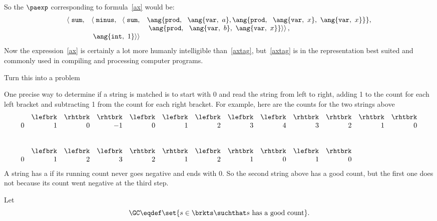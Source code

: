 \begin{editingnotes}
So the $\paexp$ corresponding to formula~\ref{ax} would be:
\begin{equation}\label{axtag}
\begin{array}{rll}
\left< \right. \texttt{sum}, 
         & \left< \right. \texttt{minus},\ \ \left< \right. \texttt{sum},
               & \ang{\texttt{prod},\ \ \ang{\texttt{var},\ a},
                                     \ang{\texttt{prod},\ \
                                            \ang{\texttt{var},\ x},\
                                            \ang{\texttt{var},\ x}}},\\
                               && \left. \left. \ang{\texttt{prod},\ \
                                       \ang{\texttt{var},\ b},\
                                       \ang{\texttt{var},\ x}}
                                   \right> \right>,\\
         & \left. \left. \ang{\texttt{int},\ 1} \right> \right>
\end{array}
\end{equation}
Now the expression~\ref{ax} is certainly a lot more humanly
intelligible than~\ref{axtag}, but~\ref{axtag} is in the
representation best suited and commonly used in compiling and
processing computer programs.

\end{editingnotes}


\begin{editingnotes}

Turn this into a problem

One precise way to determine if a string is matched is to start with 0 and
read the string from left to right, adding 1 to the count for each left
bracket and subtracting 1 from the count for each right bracket.
For example, here are the counts for the two strings above
\[\begin{array}{rrrrrrrrrrrrr}
& \lefbrk & \rhtbrk & \rhtbrk & \lefbrk & \lefbrk & \lefbrk & \lefbrk &
\lefbrk & \rhtbrk & \rhtbrk & \rhtbrk & \rhtbrk\\
0 & 1 & 0 & -1 & 0 & 1 & 2 & 3 & 4 & 3 & 2 & 1 & 0\\
\\
\\
& \lefbrk & \lefbrk & \lefbrk & \rhtbrk & \rhtbrk & \lefbrk & \rhtbrk &
\rhtbrk & \lefbrk & \rhtbrk\\
0 & 1 & 2 & 3 & 2 & 1 & 2 & 1 & 0 & 1 & 0
\end{array}\]
A string has a \term{good count} if its running count never goes
negative and ends with 0.  So the second string above has a good count, but
the first one does not because its count went negative at the third step.
\begin{definition}\label{gc-def}
Let
\[
\GC \eqdef \set{ s \in \brkts \suchthat s\ \text{has a good count}}.
\]
\end{definition}
\end{editingnotes}

\endinput
